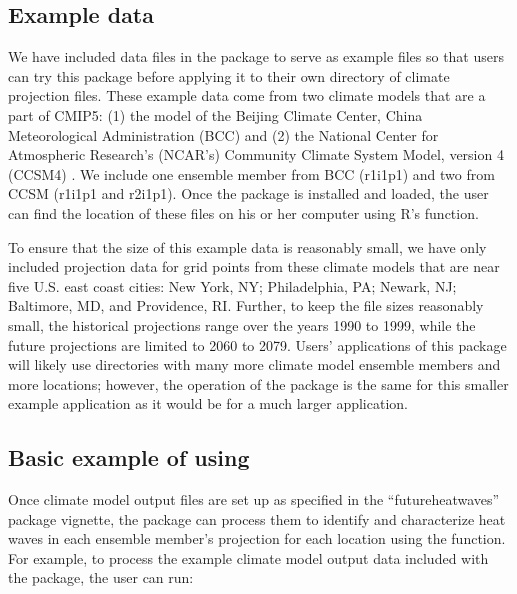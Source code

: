 \subsection{Example data}\label{example-data}

We have included data files in the package to serve as example files so
that users can try this package before applying it to their own
directory of climate projection files. These example data come from two
climate models that are a part of CMIP5: (1) the model of the Beijing
Climate Center, China Meteorological Administration (BCC)
\citep{xin2013introduction} and (2) the National Center for Atmospheric
Research's (NCAR's) Community Climate System Model, version 4 (CCSM4)
\citep{gent2011community}. We include one ensemble member from BCC
(r1i1p1) and two from CCSM (r1i1p1 and r2i1p1). Once the
 package is installed and loaded, the user can find
the location of these files on his or her computer using R's
 function.

To ensure that the size of this example data is reasonably small, we
have only included projection data for grid points from these climate
models that are near five U.S. east coast cities: New York, NY;
Philadelphia, PA; Newark, NJ; Baltimore, MD, and Providence, RI.
Further, to keep the file sizes reasonably small, the historical
projections range over the years 1990 to 1999, while the future
projections are limited to 2060 to 2079. Users' applications of this
package will likely use directories with many more climate model
ensemble members and more locations; however, the operation of the
package is the same for this smaller example application as it would be
for a much larger application.

\subsection{\texorpdfstring{Basic example of using
}{Basic example of using }}\label{basic-example-of-using}

Once climate model output files are set up as specified in the
``futureheatwaves'' package vignette, the package can process them to
identify and characterize heat waves in each ensemble member's
projection for each location using the  function. For
example, to process the example climate model output data included with
the package, the user can run:

